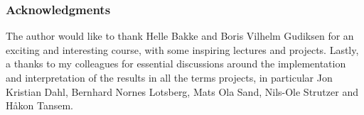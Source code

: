 \documentclass[11pt,a4paper,twocolumn,titlepage]{article}
\begin{document}
\subsubsection*{Acknowledgments}
The author would like to thank Helle Bakke and Boris Vilhelm Gudiksen for an exciting and interesting course, with some inspiring lectures and projects. Lastly, a thanks to my colleagues for essential discussions around the implementation and interpretation of the results in all the terms projects, in particular Jon Kristian Dahl, Bernhard Nornes Lotsberg, Mats Ola Sand, Nils-Ole Strutzer and Håkon Tansem.


\end{document}

